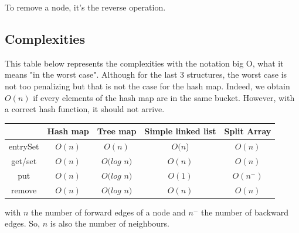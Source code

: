 To remove a node, it's the reverse operation.


\subsection{Complexities}

This table below represents the complexities with the notation big O, what it means "in the worst case". Although for the last 3 structures, the worst case is not too penalizing but that is not the case for the hash map. Indeed, we obtain $O(n)$ if every elements of the hash map are in the same bucket. However, with a correct hash function, it should not arrive. \newline

\begin{tabular}{|c|c|c|c|c|}
	\hline
     & \textbf{Hash map} & \textbf{Tree map} & \textbf{Simple linked list} & \textbf{Split Array} \\
     \hline	
   entrySet & $O(n)$ & $O(n)$ & $O(n$) & $O(n)$\\
   get/set & $O(n)$ & $O(log$ $n)$ & $O(n)$ & $O(n)$\\
   put & $O(n)$ & $O(log$ $n)$ & $O(1)$ & $O(n^-)$\\
   remove & $O(n)$ & $O(log$ $n)$ & $O(n)$ & $O(n)$\\
   \hline
\end{tabular} \newline
with $n$ the number of forward edges of a node and $n^-$ the number of backward edges. So, $n$ is also the number of neighbours.